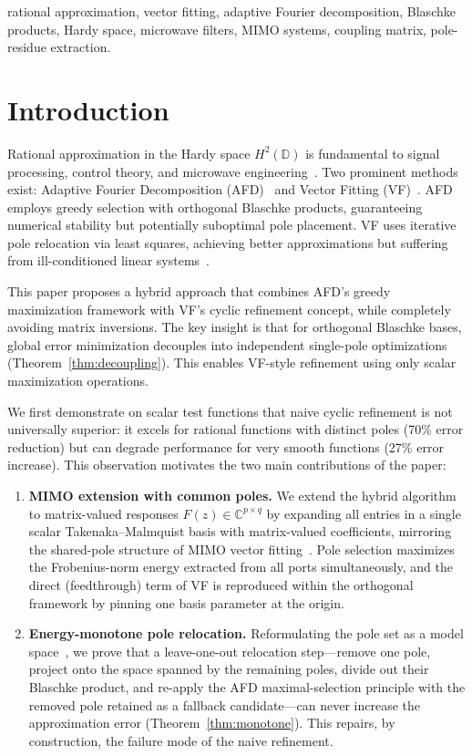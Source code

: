 \documentclass[journal]{IEEEtran}%
\begin{document}
\begin{IEEEkeywords}
rational approximation, vector fitting, adaptive Fourier decomposition, Blaschke products, Hardy space, microwave filters, MIMO systems, coupling matrix, pole-residue extraction.
\end{IEEEkeywords}

\section{Introduction}

Rational approximation in the Hardy space $H^2(\mathbb{D})$ is fundamental to signal processing, control theory, and microwave engineering~\cite{partington2004interpolation}. Two prominent methods exist: Adaptive Fourier Decomposition (AFD)~\cite{qian2013adaptive} and Vector Fitting (VF)~\cite{gustavsen1999rational}. AFD employs greedy selection with orthogonal Blaschke products, guaranteeing numerical stability but potentially suboptimal pole placement. VF uses iterative pole relocation via least squares, achieving better approximations but suffering from ill-conditioned linear systems~\cite{gustavsen2006improving,deschrijver2008macromodeling}.

This paper proposes a hybrid approach that combines AFD's greedy maximization framework with VF's cyclic refinement concept, while completely avoiding matrix inversions. The key insight is that for orthogonal Blaschke bases, global error minimization decouples into independent single-pole optimizations (Theorem~\ref{thm:decoupling}). This enables VF-style refinement using only scalar maximization operations.

We first demonstrate on scalar test functions that naive cyclic refinement is not universally superior: it excels for rational functions with distinct poles (70\% error reduction) but can degrade performance for very smooth functions (27\% error increase). This observation motivates the two main contributions of the paper:
\begin{enumerate}
  \item \textbf{MIMO extension with common poles.} We extend the hybrid algorithm to matrix-valued responses $F(z)\in\mathbb{C}^{p\times q}$ by expanding all entries in a single scalar Takenaka--Malmquist basis with matrix-valued coefficients, mirroring the shared-pole structure of MIMO vector fitting~\cite{deschrijver2008macromodeling}. Pole selection maximizes the Frobenius-norm energy extracted from all ports simultaneously, and the direct (feedthrough) term of VF is reproduced within the orthogonal framework by pinning one basis parameter at the origin.
  \item \textbf{Energy-monotone pole relocation.} Reformulating the pole set as a model space~\cite{garnett2007bounded}, we prove that a leave-one-out relocation step---remove one pole, project onto the space spanned by the remaining poles, divide out their Blaschke product, and re-apply the AFD maximal-selection principle with the removed pole retained as a fallback candidate---can never increase the approximation error (Theorem~\ref{thm:monotone}). This repairs, by construction, the failure mode of the naive refinement.
\end{enumerate}
\end{document}
